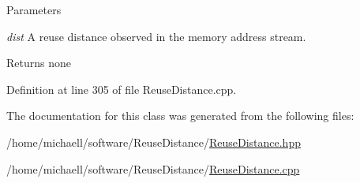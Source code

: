 \begin{DoxyParams}{Parameters}
\item[{\em dist}]A reuse distance observed in the memory address stream.\end{DoxyParams}
\begin{DoxyReturn}{Returns}
none 
\end{DoxyReturn}


Definition at line 305 of file ReuseDistance.cpp.



The documentation for this class was generated from the following files:\begin{DoxyCompactItemize}
\item 
/home/michaell/software/ReuseDistance/\hyperlink{_reuse_distance_8hpp}{ReuseDistance.hpp}\item 
/home/michaell/software/ReuseDistance/\hyperlink{_reuse_distance_8cpp}{ReuseDistance.cpp}\end{DoxyCompactItemize}
